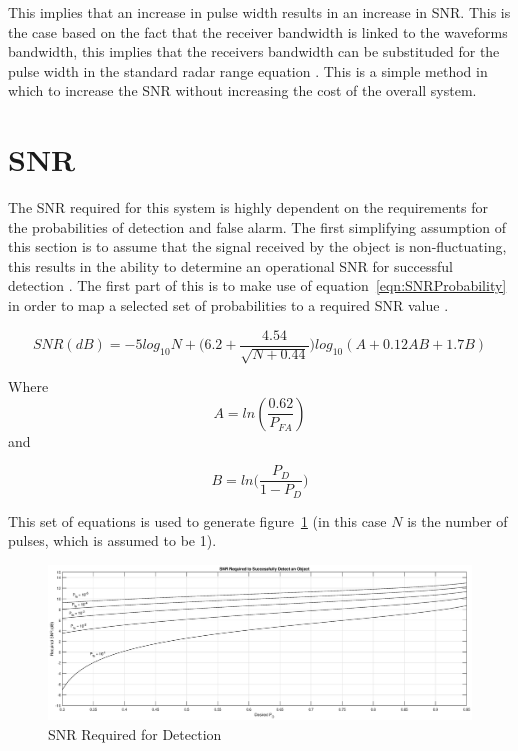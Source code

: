 \documentclass[11pt]{witseiepaper}
\begin{document}
This implies that an increase in pulse width results in an increase in SNR. This is the case based on the fact that the receiver bandwidth is linked to the waveforms bandwidth, this implies that the receivers bandwidth can be substituded for the pulse width in the standard radar range equation \cite[p.~776]{radarHandbook}.
This is a simple method in which to increase the SNR without increasing the cost of the overall system.



\section{SNR} \label{sec:SNR}
The SNR required for this system is highly dependent on the requirements for the probabilities of detection and false alarm. The first simplifying assumption of this section is to assume that the signal received by the object is non-fluctuating, this results in the ability to determine an operational SNR for successful detection \cite[p.~102-103]{radarHandbook}.
The first part of this is to make use of equation~\ref{eqn:SNRProbability} in order to map a selected set of probabilities to a required SNR value \cite[p.~107]{radarHandbook}.

\begin{equation} \label{eqn:SNRProbability}
SNR (dB) = -5 log_{10}N + \Bigg(6.2 + \frac{4.54}{\sqrt{N + 0.44}}\Bigg) log_{10}(A + 0.12 A B + 1.7 B)
\end{equation}

Where 
\begin{equation} \label{eqn:A}
A = ln(\frac{0.62}{P_{FA}})
\end{equation}
and 

\begin{equation} \label{eqn:B}
B = ln \Bigg( \frac{P_D}{1 - P_D} \Bigg)
\end{equation}

This set of equations is used to generate figure~\ref{fig:SNRRequired} (in this case $N$ is the number of pulses, which is assumed to be 1).

\begin{center}
    \begin{figure}
        \includegraphics[width=\textwidth]{ProbabilityDetection.eps}
        \caption{SNR Required for Detection}
        \label{fig:SNRRequired}    
    \end{figure}
\end{center}
\end{document}
